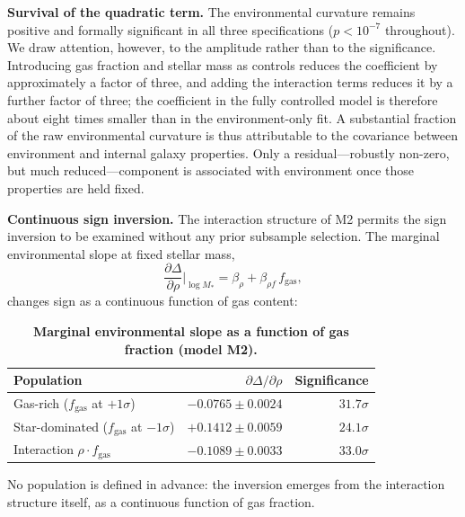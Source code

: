 \textbf{Survival of the quadratic term.} The environmental curvature remains
positive and formally significant in all three specifications
($p < 10^{-7}$ throughout). We draw attention, however, to the amplitude rather
than to the significance. Introducing gas fraction and stellar mass as controls
reduces the coefficient by approximately a factor of three, and adding the
interaction terms reduces it by a further factor of three; the coefficient in the
fully controlled model is therefore about eight times smaller than in the
environment-only fit. A substantial fraction of the raw environmental curvature
is thus attributable to the covariance between environment and internal galaxy
properties. Only a residual---robustly non-zero, but much reduced---component is
associated with environment once those properties are held fixed.

\textbf{Continuous sign inversion.} The interaction structure of M2 permits the
sign inversion to be examined without any prior subsample selection. The marginal
environmental slope at fixed stellar mass,
\begin{equation}
\frac{\partial \Delta}{\partial \rho}\bigg|_{\log M_*}
= \beta_\rho + \beta_{\rho f}\, f_{\mathrm{gas}},
\end{equation}
changes sign as a continuous function of gas content:

\begin{table}[htbp]
\centering
\caption{\textbf{Marginal environmental slope as a function of gas fraction (model M2).}}
\small
\begin{tabular}{@{}lrr@{}}
\toprule
\textbf{Population} & \textbf{$\partial \Delta / \partial \rho$} & \textbf{Significance} \\
\midrule
Gas-rich ($f_{\mathrm{gas}}$ at $+1\sigma$)      & $-0.0765 \pm 0.0024$ & $31.7\sigma$ \\
Star-dominated ($f_{\mathrm{gas}}$ at $-1\sigma$) & $+0.1412 \pm 0.0059$ & $24.1\sigma$ \\
\midrule
Interaction $\rho \cdot f_{\mathrm{gas}}$         & $-0.1089 \pm 0.0033$ & $33.0\sigma$ \\
\bottomrule
\end{tabular}
\label{tab:S4_marginal}
\end{table}

No population is defined in advance: the inversion emerges from the interaction
structure itself, as a continuous function of gas fraction.

